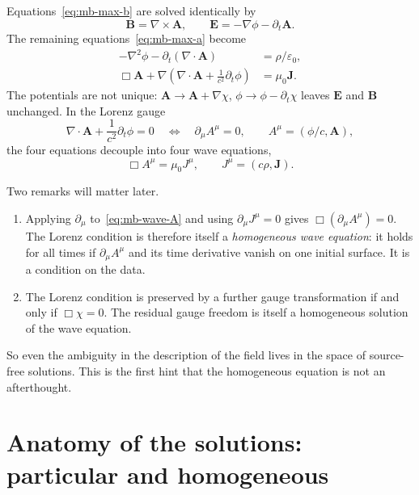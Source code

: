 Equations~\eqref{eq:mb-max-b} are solved identically by
\begin{equation}
\mathbf B=\nabla\times\mathbf A,\qquad
\mathbf E=-\nabla\phi-\partial_t\mathbf A .
\label{eq:mb-potentials}
\end{equation}
The remaining equations~\eqref{eq:mb-max-a} become
\begin{align}
-\nabla^2\phi-\partial_t(\nabla\cdot\mathbf A)&=\rho/\varepsilon_0,\\
\Box\mathbf A+\nabla\!\left(\nabla\cdot\mathbf A+\frac1{c^2}\partial_t\phi\right)&=\mu_0\mathbf J .
\end{align}
The potentials are not unique: $\mathbf A\to\mathbf A+\nabla\chi$,
$\phi\to\phi-\partial_t\chi$ leaves $\mathbf E$ and $\mathbf B$ unchanged. In
the Lorenz gauge
\begin{equation}
\nabla\cdot\mathbf A+\frac1{c^2}\partial_t\phi=0
\quad\Longleftrightarrow\quad
\partial_\mu A^\mu=0,\qquad A^\mu=(\phi/c,\mathbf A),
\label{eq:mb-lorenz}
\end{equation}
the four equations decouple into four wave equations,
\begin{equation}
\Box A^\mu=\mu_0 J^\mu,\qquad J^\mu=(c\rho,\mathbf J).
\label{eq:mb-wave-A}
\end{equation}

Two remarks will matter later.

\begin{enumerate}
\item Applying $\partial_\mu$ to~\eqref{eq:mb-wave-A} and using
$\partial_\mu J^\mu=0$ gives $\Box(\partial_\mu A^\mu)=0$. The Lorenz
condition is therefore itself a \emph{homogeneous wave equation}: it holds
for all times if $\partial_\mu A^\mu$ and its time derivative vanish on one
initial surface. It is a condition on the data.
\item The Lorenz condition is preserved by a further gauge transformation
if and only if $\Box\chi=0$. The residual gauge freedom is itself a
homogeneous solution of the wave equation.
\end{enumerate}

So even the ambiguity in the description of the field lives in the space of
source-free solutions. This is the first hint that the homogeneous equation
is not an afterthought.

\section{Anatomy of the solutions: particular and homogeneous}
\label{sec:mb-anatomy}

